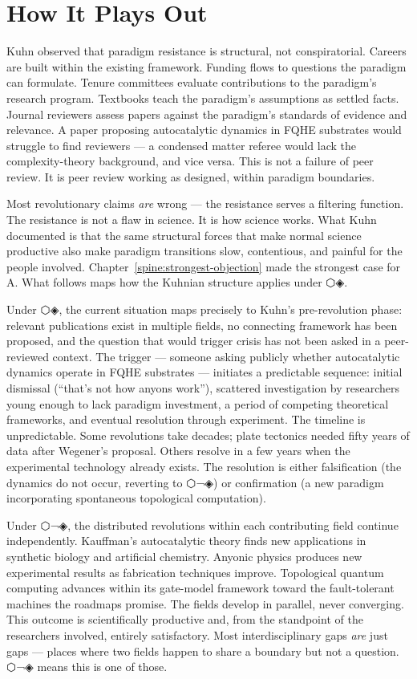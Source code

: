 \section*{How It Plays Out}
\label{spine:sr-how-it-plays-out}

Kuhn observed that paradigm resistance is structural, not conspiratorial. Careers are built within the existing framework. Funding flows to questions the paradigm can formulate. Tenure committees evaluate contributions to the paradigm's research program. Textbooks teach the paradigm's assumptions as settled facts. Journal reviewers assess papers against the paradigm's standards of evidence and relevance. A paper proposing autocatalytic dynamics in FQHE substrates would struggle to find reviewers --- a condensed matter referee would lack the complexity-theory background, and vice versa. This is not a failure of peer review. It is peer review working as designed, within paradigm boundaries.

Most revolutionary claims \emph{are} wrong --- the resistance serves a filtering function. The resistance is not a flaw in science. It is how science works. What Kuhn documented is that the same structural forces that make normal science productive also make paradigm transitions slow, contentious, and painful for the people involved. Chapter~\ref{spine:strongest-objection} made the strongest case for A. What follows maps how the Kuhnian structure applies under ⬡◈.

Under ⬡◈, the current situation maps precisely to Kuhn's pre-revolution phase: relevant publications exist in multiple fields, no connecting framework has been proposed, and the question that would trigger crisis has not been asked in a peer-reviewed context. The trigger --- someone asking publicly whether autocatalytic dynamics operate in FQHE substrates --- initiates a predictable sequence: initial dismissal (``that's not how anyons work''), scattered investigation by researchers young enough to lack paradigm investment, a period of competing theoretical frameworks, and eventual resolution through experiment. The timeline is unpredictable. Some revolutions take decades; plate tectonics needed fifty years of data after Wegener's proposal. Others resolve in a few years when the experimental technology already exists. The resolution is either falsification (the dynamics do not occur, reverting to ⬡¬◈) or confirmation (a new paradigm incorporating spontaneous topological computation).

Under ⬡¬◈, the distributed revolutions within each contributing field continue independently. Kauffman's autocatalytic theory finds new applications in synthetic biology and artificial chemistry. Anyonic physics produces new experimental results as fabrication techniques improve. Topological quantum computing advances within its gate-model framework toward the fault-tolerant machines the roadmaps promise. The fields develop in parallel, never converging. This outcome is scientifically productive and, from the standpoint of the researchers involved, entirely satisfactory. Most interdisciplinary gaps \emph{are} just gaps --- places where two fields happen to share a boundary but not a question. ⬡¬◈ means this is one of those.

